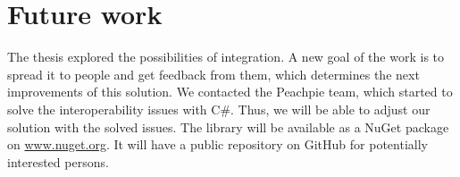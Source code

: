 \section*{Future work}

The thesis explored the possibilities of integration.
A new goal of the work is to spread it to people and get feedback from them, which determines the next improvements of this solution.
We contacted the Peachpie team, which started to solve the interoperability issues with C\#.
Thus, we will be able to adjust our solution with the solved issues.
The library will be available as a NuGet package on \url{www.nuget.org}. It will have a public repository on GitHub for potentially interested persons.

